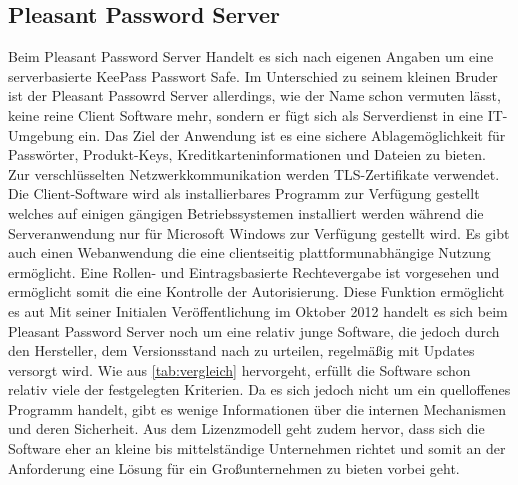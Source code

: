 \documentclass[
a4paper,   
titlepage,  
halfparskip,
12pt        
]{scrartcl}
\begin{document}
\begin{onehalfspacing}
\subsection{Pleasant Password Server}
Beim Pleasant Password Server Handelt es sich nach eigenen Angaben um eine serverbasierte KeePass Passwort Safe. Im Unterschied zu seinem kleinen Bruder ist der Pleasant Passowrd Server allerdings, wie der Name schon vermuten lässt, keine reine Client Software mehr, sondern er fügt sich als Serverdienst in eine \ac{IT}-Umgebung ein. Das Ziel der Anwendung ist es eine sichere Ablagemöglichkeit für Passwörter, Produkt-Keys, Kreditkarteninformationen und Dateien zu bieten. Zur verschlüsselten Netzwerkkommunikation werden \ac{TLS}-Zertifikate verwendet. Die Client-Software wird als installierbares Programm zur Verfügung gestellt welches auf einigen gängigen Betriebssystemen installiert werden während die Serveranwendung nur für Microsoft Windows zur Verfügung gestellt wird. Es gibt auch einen Webanwendung die eine clientseitig plattformunabhängige Nutzung ermöglicht. 
Eine Rollen- und Eintragsbasierte Rechtevergabe ist vorgesehen und ermöglicht somit die eine Kontrolle der Autorisierung. Diese Funktion ermöglicht es aut Mit seiner Initialen Veröffentlichung im Oktober 2012 handelt es sich beim Pleasant Password Server noch um eine relativ junge Software, die jedoch durch den Hersteller, dem Versionsstand nach zu urteilen, regelmäßig mit Updates versorgt wird.\cite{pleasant}
Wie aus \autoref{tab:vergleich} hervorgeht, erfüllt die Software schon relativ viele der festgelegten Kriterien. Da es sich jedoch nicht um ein quelloffenes Programm handelt, gibt es wenige Informationen über die internen Mechanismen und deren Sicherheit. Aus dem Lizenzmodell geht zudem hervor, dass sich die Software eher an kleine bis mittelständige Unternehmen richtet und somit an der Anforderung eine Lösung für ein Großunternehmen zu bieten vorbei geht.


\end{onehalfspacing}
\end{document}
